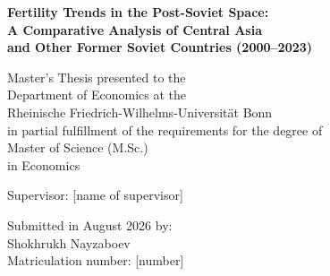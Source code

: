 \documentclass[11pt, a4paper]{article}
\begin{document}
\begin{titlepage}
\centering
\vspace*{3cm}

{\LARGE\bfseries Fertility Trends in the Post-Soviet Space: \\[6pt]
A Comparative Analysis of Central Asia \\[6pt]
and Other Former Soviet Countries (2000--2023) \par}

\vspace{2cm}

{\large Master's Thesis presented to the \\
Department of Economics at the \\
Rheinische Friedrich-Wilhelms-Universit\"at Bonn \\[12pt]
in partial fulfillment of the requirements for the degree of \\[12pt]
Master of Science (M.Sc.) \\
in Economics \par}

\vspace{2cm}

Supervisor: [name of supervisor]       %

\vspace{1.5cm}

Submitted in August 2026 by: \\[6pt]
Shokhrukh Nayzaboev \\[6pt]
Matriculation number: [number]         %

\vfill
\end{titlepage}


\end{document}
